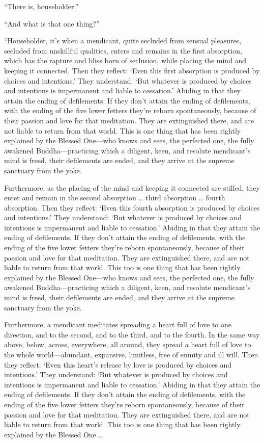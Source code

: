 \documentclass[12pt,openany]{book}%
\begin{document}
“There is, householder.” 

“And what is that one thing?” 

“Householder, it’s when a mendicant, quite secluded from sensual pleasures, secluded from unskillful qualities, enters and remains in the first absorption, which has the rapture and bliss born of seclusion, while placing the mind and keeping it connected. Then they reflect: ‘Even this first absorption is produced by choices and intentions.’ They understand: ‘But whatever is produced by choices and intentions is impermanent and liable to cessation.’ Abiding in that they attain the ending of defilements. If they don’t attain the ending of defilements, with the ending of the five lower fetters they’re reborn spontaneously, because of their passion and love for that meditation. They are extinguished there, and are not liable to return from that world. This is one thing that has been rightly explained by the Blessed One—who knows and sees, the perfected one, the fully awakened Buddha—practicing which a diligent, keen, and resolute mendicant’s mind is freed, their defilements are ended, and they arrive at the supreme sanctuary from the yoke. 

Furthermore, as the placing of the mind and keeping it connected are stilled, they enter and remain in the second absorption … third absorption … fourth absorption. Then they reflect: ‘Even this fourth absorption is produced by choices and intentions.’ They understand: ‘But whatever is produced by choices and intentions is impermanent and liable to cessation.’ Abiding in that they attain the ending of defilements. If they don’t attain the ending of defilements, with the ending of the five lower fetters they’re reborn spontaneously, because of their passion and love for that meditation. They are extinguished there, and are not liable to return from that world. This too is one thing that has been rightly explained by the Blessed One—who knows and sees, the perfected one, the fully awakened Buddha—practicing which a diligent, keen, and resolute mendicant’s mind is freed, their defilements are ended, and they arrive at the supreme sanctuary from the yoke. 

Furthermore, a mendicant meditates spreading a heart full of love to one direction, and to the second, and to the third, and to the fourth. In the same way above, below, across, everywhere, all around, they spread a heart full of love to the whole world—abundant, expansive, limitless, free of enmity and ill will. Then they reflect: ‘Even this heart’s release by love is produced by choices and intentions.’ They understand: ‘But whatever is produced by choices and intentions is impermanent and liable to cessation.’ Abiding in that they attain the ending of defilements. If they don’t attain the ending of defilements, with the ending of the five lower fetters they’re reborn spontaneously, because of their passion and love for that meditation. They are extinguished there, and are not liable to return from that world. This too is one thing that has been rightly explained by the Blessed One … 
\end{document}
